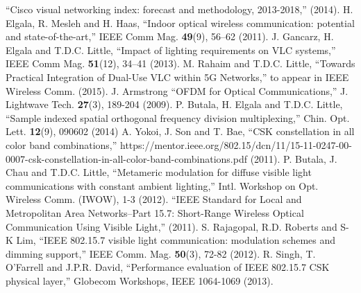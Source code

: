 \documentclass[10pt,letterpaper]{article}
\begin{document}
\begin{thebibliography}{99}
 ``{Cisco visual networking index: forecast and methodology, 2013-2018},'' (2014).
 H. Elgala, R. Mesleh and H. Haas, ``{Indoor optical wireless communication: potential and state-of-the-art},'' IEEE Comm Mag. {\bf 49}(9), 56--62 (2011).
 J. Gancarz, H. Elgala and T.D.C. Little, ``{Impact of lighting requirements on VLC systems},'' IEEE Comm Mag. {\bf 51}(12), 34--41 (2013).
 M. Rahaim and T.D.C. Little, ``{Towards Practical Integration of Dual-Use VLC within 5G Networks},'' to appear in IEEE Wireless Comm. (2015).
 J. Armstrong ``{OFDM for Optical Communications},'' J. Lightwave Tech. {\bf 27}(3), 189-204 (2009).
 P. Butala, H. Elgala and T.D.C. Little, ``{Sample indexed spatial orthogonal frequency division multiplexing},'' Chin. Opt. Lett. {\bf 12}(9), 090602 (2014)
 A. Yokoi, J. Son and T. Bae, ``{CSK constellation in all color band combinations},'' {https://mentor.ieee.org/802.15/dcn/11/15-11-0247-00-0007-csk-constellation-in-all-color-band-combinations.pdf} (2011).
 P. Butala, J. Chau and T.D.C. Little, ``{Metameric modulation for diffuse visible light communications with constant ambient lighting},'' Intl. Workshop on Opt. Wireless Comm. (IWOW), 1-3 (2012).
 ``{IEEE Standard for Local and Metropolitan Area Networks--Part 15.7: Short-Range Wireless Optical Communication Using Visible Light},'' (2011).
 S. Rajagopal, R.D. Roberts and S-K Lim, ``{IEEE 802.15.7 visible light communication: modulation schemes and dimming support},'' IEEE Comm. Mag. {\bf 50}(3), 72-82 (2012).
 R. Singh, T. O'Farrell and J.P.R. David, ``{Performance evaluation of IEEE 802.15.7 CSK physical layer},'' Globecom Workshops, IEEE 1064-1069 (2013).


\end{thebibliography}
\end{document}

